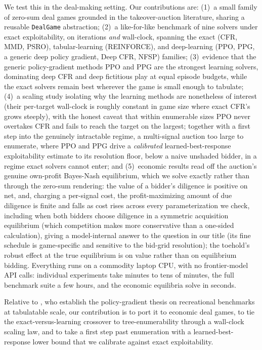 \documentclass[11pt,a4paper]{article}
\begin{document}
We test this in the deal-making setting. Our contributions are: (1)~a small family
of zero-sum deal games grounded in the takeover-auction literature, sharing a
reusable \texttt{DealGame} abstraction; (2)~a like-for-like benchmark of nine
solvers under exact exploitability, on iterations \emph{and} wall-clock, spanning
the exact (CFR, MMD, PSRO), tabular-learning (REINFORCE), and deep-learning (PPO,
PPG, a generic deep policy gradient, Deep CFR, NFSP) families; (3)~evidence that the
generic policy-gradient methods PPO and PPG are the strongest learning solvers,
dominating deep CFR and deep fictitious play at equal episode budgets, while the
exact solvers remain best wherever the game is small enough to tabulate; (4)~a
scaling study isolating why the learning methods are nonetheless of interest (their
per-target wall-clock is roughly constant in game size where exact CFR's grows
steeply), with the honest caveat that within enumerable sizes PPO never overtakes CFR
and fails to reach the target on the largest; together with a first step into the
genuinely intractable regime, a multi-signal auction too large to enumerate, where PPO
and PPG drive a \emph{calibrated} learned-best-response exploitability estimate to its
resolution floor, below a naive unshaded bidder, in a regime exact solvers cannot
enter; and (5)~economic results read off the auction's genuine own-profit Bayes-Nash
equilibrium, which we solve exactly rather than through the zero-sum rendering: the
value of a bidder's diligence is positive on net, and, charging a per-signal cost, the
profit-maximizing amount of due diligence is finite and falls as cost rises across every
parameterization we check, including when both bidders choose diligence in a symmetric
acquisition equilibrium (which competition makes more conservative than a one-sided
calculation), giving a model-internal answer to the question in our title (its fine
schedule is game-specific and sensitive to the bid-grid resolution); the toehold's
robust effect at the true equilibrium is on value rather than on equilibrium bidding. Everything runs on
a commodity laptop CPU, with no frontier-model API calls: individual experiments take
minutes to tens of minutes, the full benchmark suite a few hours, and the economic
equilibria solve in seconds.

Relative to \citet{rudolph2026}, who establish the policy-gradient thesis on
recreational benchmarks at tabulatable scale, our contribution is to port it to
economic deal games, to tie the exact-versus-learning crossover to tree-enumerability
through a wall-clock scaling law, and to take a first step past enumeration with a
learned-best-response lower bound that we calibrate against exact exploitability.
\end{document}

